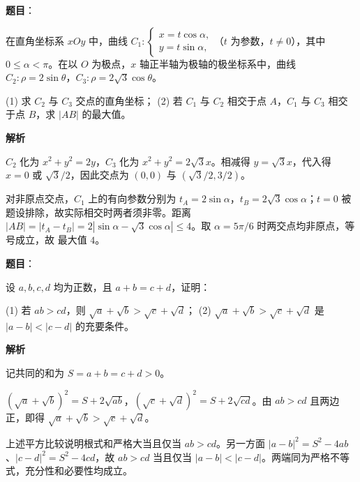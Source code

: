 \begin{answer}

\textbf{题目}：

在直角坐标系 $xOy$ 中，曲线 $C_1:\begin{cases}x=t\cos\alpha,\\y=t\sin\alpha,\end{cases}$（$t$ 为参数，$t\ne0$），其中 $0\le\alpha<\pi$。在以 $O$ 为极点，$x$ 轴正半轴为极轴的极坐标系中，曲线 $C_2:\rho=2\sin\theta$，$C_3:\rho=2\sqrt3\cos\theta$。

(1) 求 $C_2$ 与 $C_3$ 交点的直角坐标；  
(2) 若 $C_1$ 与 $C_2$ 相交于点 $A$，$C_1$ 与 $C_3$ 相交于点 $B$，求 $|AB|$ 的最大值。

\textbf{解析}


$C_2$ 化为 $x^2+y^2=2y$，$C_3$ 化为 $x^2+y^2=2\sqrt3x$。相减得 $y=\sqrt3x$，代入得 $x=0$ 或 $\sqrt3/2$，因此交点为 $(0,0)$ 与 $(\sqrt3/2,3/2)$。


对非原点交点，$C_1$ 上的有向参数分别为 $t_A=2\sin\alpha$，$t_B=2\sqrt3\cos\alpha$；$t=0$ 被题设排除，故实际相交时两者须非零。距离 $|AB|=|t_A-t_B|=2|\sin\alpha-\sqrt3\cos\alpha|\le4$。取 $\alpha=5\pi/6$ 时两交点均非原点，等号成立，故 最大值 $4$。



\end{answer}
\begin{answer}

\textbf{题目}：

设 $a,b,c,d$ 均为正数，且 $a+b=c+d$，证明：

(1) 若 $ab>cd$，则 $\sqrt a+\sqrt b>\sqrt c+\sqrt d$；  
(2) $\sqrt a+\sqrt b>\sqrt c+\sqrt d$ 是 $|a-b|<|c-d|$ 的充要条件。

\textbf{解析}

记共同的和为 $S=a+b=c+d>0$。


$(\sqrt a+\sqrt b)^2=S+2\sqrt{ab}$，$(\sqrt c+\sqrt d)^2=S+2\sqrt{cd}$。由 $ab>cd$ 且两边正，即得 $\sqrt a+\sqrt b>\sqrt c+\sqrt d$。


上述平方比较说明根式和严格大当且仅当 $ab>cd$。另一方面 $|a-b|^2=S^2-4ab$、$|c-d|^2=S^2-4cd$，故 $ab>cd$ 当且仅当 $|a-b|<|c-d|$。两端同为严格不等式，充分性和必要性均成立。



\end{answer}